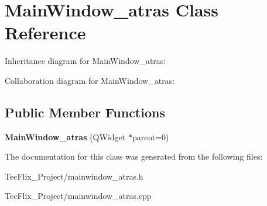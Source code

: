 \hypertarget{classMainWindow__atras}{}\section{Main\+Window\+\_\+atras Class Reference}
\label{classMainWindow__atras}


Inheritance diagram for Main\+Window\+\_\+atras\+:


Collaboration diagram for Main\+Window\+\_\+atras\+:
\subsection*{Public Member Functions}
\begin{DoxyCompactItemize}
\item 
\mbox{\label{classMainWindow__atras_a3089b56641da5731d522c4eb727e8def}} 
{\bfseries Main\+Window\+\_\+atras} (Q\+Widget $\ast$parent=0)
\end{DoxyCompactItemize}


The documentation for this class was generated from the following files\+:\begin{DoxyCompactItemize}
\item 
Tec\+Flix\+\_\+\+Project/mainwindow\+\_\+atras.\+h\item 
Tec\+Flix\+\_\+\+Project/mainwindow\+\_\+atras.\+cpp\end{DoxyCompactItemize}
